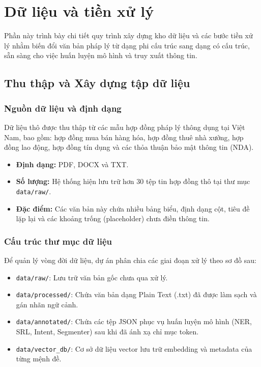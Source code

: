 \section{Dữ liệu và tiền xử lý}

Phần này trình bày chi tiết quy trình xây dựng kho dữ liệu và các bước tiền xử lý nhằm biến đổi văn bản pháp lý từ dạng phi cấu trúc sang dạng có cấu trúc, sẵn sàng cho việc huấn luyện mô hình và truy xuất thông tin.

\subsection{Thu thập và Xây dựng tập dữ liệu}

\subsubsection{Nguồn dữ liệu và định dạng}
Dữ liệu thô được thu thập từ các mẫu hợp đồng pháp lý thông dụng tại Việt Nam, bao gồm: hợp đồng mua bán hàng hóa, hợp đồng thuê nhà xưởng, hợp đồng lao động, hợp đồng tín dụng và các thỏa thuận bảo mật thông tin (NDA).
\begin{itemize}
    \item \textbf{Định dạng:} PDF, DOCX và TXT.
    \item \textbf{Số lượng:} Hệ thống hiện lưu trữ hơn 30 tệp tin hợp đồng thô tại thư mục \texttt{data/raw/}.
    \item \textbf{Đặc điểm:} Các văn bản này chứa nhiều bảng biểu, định dạng cột, tiêu đề lặp lại và các khoảng trống (placeholder) chưa điền thông tin.
\end{itemize}

\subsubsection{Cấu trúc thư mục dữ liệu}
Để quản lý vòng đời dữ liệu, dự án phân chia các giai đoạn xử lý theo sơ đồ sau:
\begin{itemize}
    \item \texttt{data/raw/}: Lưu trữ văn bản gốc chưa qua xử lý.
    \item \texttt{data/processed/}: Chứa văn bản dạng Plain Text (.txt) đã được làm sạch và gán nhãn ngữ cảnh.
    \item \texttt{data/annotated/}: Chứa các tệp JSON phục vụ huấn luyện mô hình (NER, SRL, Intent, Segmenter) sau khi đã ánh xạ chỉ mục token.
    \item \texttt{data/vector\_db/}: Cơ sở dữ liệu vector lưu trữ embedding và metadata của từng mệnh đề.
\end{itemize}

